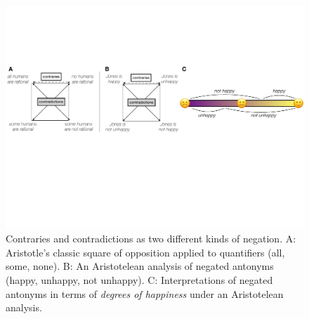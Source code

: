 \documentclass[floatsintext,doc]{apa6}
\begin{document}
\begin{figure}[t]
\center \includegraphics[width=1\textwidth]{figs/opp-square2}  
\caption{Contraries and contradictions as two different kinds of negation. A: Aristotle's classic square of opposition applied to quantifiers (all, some, none). B: An Aristotelean analysis of negated antonyms (happy, unhappy, not unhappy). C: Interpretations of negated antonyms in terms of \emph{degrees of happiness} under an Aristotelean analysis.}\label{fig:opp-square}
\end{figure}
\end{document}
